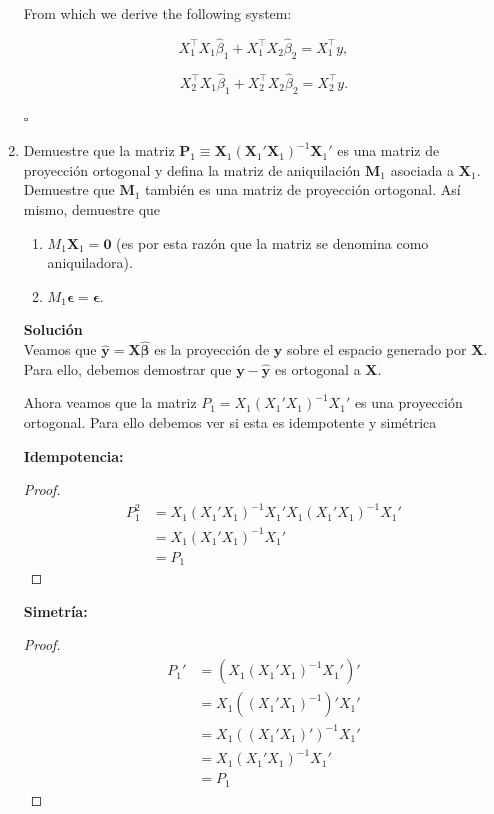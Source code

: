 \documentclass[a4paper, answers, addpoints, 11pt]{exam}
\begin{document}
\begin{enumerate}
\begin{mdframed}
From which we derive the following system:

\[
X_1^\top X_1 \hat{\beta}_1 + X_1^\top X_2 \hat{\beta}_2 = X_1^\top y,
\]

\[
X_2^\top X_1 \hat{\beta}_1 + X_2^\top X_2 \hat{\beta}_2 = X_2^\top y.
\]

\(\square\)

\end{mdframed}


                
            
    \item Demuestre que la matriz $\textbf{P}_1 \equiv \textbf{X}_1(\textbf{X}_1'\textbf{X}_1)^{-1}\textbf{X}_1'$ es una matriz de proyección ortogonal y defina la matriz de aniquilación $\textbf{M}_1$ asociada a $\textbf{X}_1$. Demuestre que $\textbf{M}_1$ también es una matriz de proyección ortogonal. Así mismo, demuestre que 

    \begin{enumerate}\label{aniquiladoranotaciona}
        \item $M_1\textbf{X}_1 = \textbf{0}$ (es por esta razón que la matriz se denomina como aniquiladora).
        \item $M_1\boldsymbol\epsilon = \boldsymbol\epsilon$.
    \end{enumerate}


\begin{mdframed}
\textbf{Solución} \\
Veamos que $\boldsymbol{\hat{y}} = \boldsymbol{X}\boldsymbol{\hat{\beta}}$ es la proyección de $\boldsymbol{y}$ sobre el espacio generado por $\boldsymbol{X}$. Para ello, debemos demostrar que $\boldsymbol{y} - \boldsymbol{\hat{y}}$ es ortogonal a $\boldsymbol{X}$.

Ahora veamos que la matriz $P_1 = X_1(X_1'X_1)^{-1}X_1'$ es una proyección ortogonal. Para ello debemos ver si esta es idempotente y simétrica

\textbf{Idempotencia:}
\begin{proof}
\begin{align*}
    P_1^2 &= X_1(X_1'X_1)^{-1}X_1'X_1(X_1'X_1)^{-1}X_1' \\
    &= X_1(X_1'X_1)^{-1}X_1' \\
    &= P_1
\end{align*}
\end{proof}

\textbf{Simetría:}
\begin{proof}
\begin{align*}
    P_1' &= \left( X_1(X_1'X_1)^{-1}X_1' \right)' \\
    &= X_1 \left( (X_1'X_1)^{-1} \right)' X_1' \\
    &= X_1 \left( (X_1'X_1)' \right)^{-1} X_1' \\
    &= X_1 (X_1'X_1)^{-1} X_1' \\
    &= P_1
\end{align*}
\end{proof}


\end{mdframed}
\end{enumerate}
\end{document}
